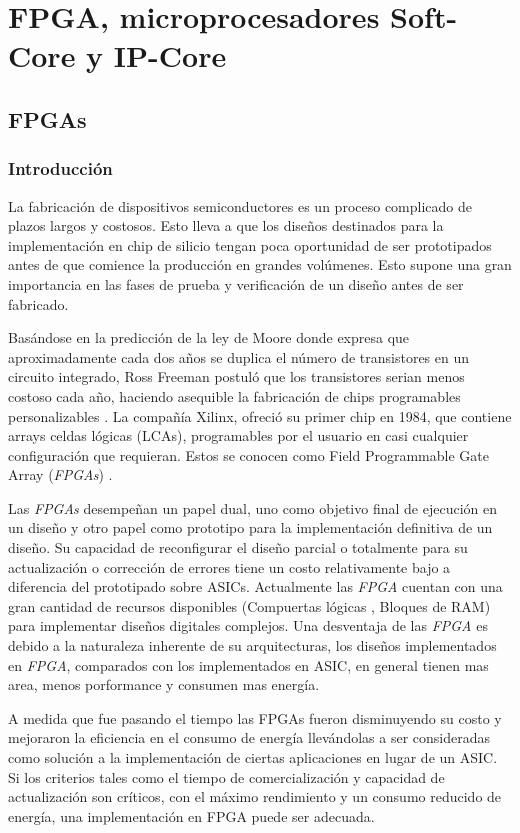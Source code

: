 \chapter{FPGA, microprocesadores Soft-Core y IP-Core}
\section{FPGAs}
	\subsection{Introducción}
	La fabricación de dispositivos semiconductores es un proceso complicado de plazos largos y costosos. Esto lleva a que los diseños destinados para la 
	implementación en chip de silicio tengan poca oportunidad de ser prototipados antes de que comience la producción en grandes volúmenes. Esto supone
	una gran importancia en las fases de prueba y verificación de un diseño antes de ser fabricado.
	
	Basándose en la predicción de la ley de Moore donde expresa que aproximadamente cada dos años se duplica el número de transistores en un circuito
	integrado\cite{Etiqueta02}, Ross Freeman postuló que los transistores serian menos costoso cada año, haciendo asequible la fabricación de chips
	programables personalizables \cite{Etiqueta03}. La compañía Xilinx, ofreció su primer chip en 1984, que contiene arrays celdas lógicas (LCAs),
	programables por el usuario en casi cualquier configuración que requieran. Estos se conocen como Field Programmable Gate Array (\textit{FPGAs}) .
	
	Las \textit{FPGAs} desempeñan un papel dual, uno como objetivo final de ejecución en un diseño y otro papel como prototipo para la implementación
	definitiva de un diseño. Su capacidad de reconfigurar el diseño parcial o totalmente para su actualización o corrección de errores tiene un costo
	relativamente bajo a diferencia del prototipado sobre ASICs. Actualmente las \textit{FPGA} cuentan con una gran cantidad de recursos disponibles
	(Compuertas lógicas , Bloques de RAM) para implementar diseños digitales complejos. Una desventaja de las \textit{FPGA} es debido a la naturaleza
	inherente de su arquitecturas, los diseños implementados en \textit{FPGA}, comparados con los implementados en ASIC, en general tienen mas area,
	menos porformance y consumen mas energía.
	
	A medida que fue pasando el tiempo las FPGAs fueron disminuyendo su costo y mejoraron la eficiencia en el consumo de energía llevándolas a ser
	consideradas como solución a la implementación de ciertas aplicaciones en lugar de un ASIC. Si los criterios tales como el tiempo de
	comercialización y capacidad de actualización son críticos, con el máximo rendimiento y un consumo reducido de energía, una implementación en FPGA
	puede ser adecuada.
	
